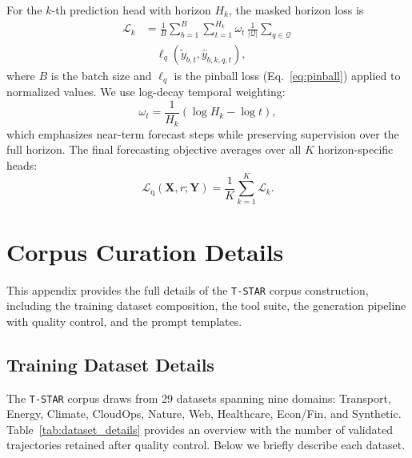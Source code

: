 \documentclass[11pt]{article}
\begin{document}
For the $k$-th prediction head with horizon $H_k$, the masked horizon loss is
\begin{equation}
    \begin{aligned}
    \mathcal{L}_{k}
    &=
    \frac{1}{B}
    \sum_{b=1}^{B}
    \sum_{t=1}^{H_k}
    \omega_t\,
    \frac{1}{|\mathcal{Q}|}
    \sum_{q\in\mathcal{Q}} \\
    &\quad
    \ell_q(\tilde{y}_{b,t},\hat{y}_{b,k,q,t}),
    \end{aligned}
\end{equation}
where $B$ is the batch size and $\ell_q$ is the pinball loss (Eq.~\eqref{eq:pinball}) applied to normalized values.
We use log-decay temporal weighting:
\begin{equation}
    \omega_t = \frac{1}{H_k}\left(\log H_k - \log t\right),
\end{equation}
which emphasizes near-term forecast steps while preserving supervision over the full horizon.
The final forecasting objective averages over all $K$ horizon-specific heads:
\begin{equation}
    \mathcal{L}_{\mathrm{q}}(\mathbf{X}, r; \mathbf{Y})
    =
    \frac{1}{K}
    \sum_{k=1}^{K}
    \mathcal{L}_{k}.
\end{equation}



\section{Corpus Curation Details}

This appendix provides the full details of the \texttt{T-STAR} corpus construction, including the training dataset composition, the tool suite, the generation pipeline with quality control, and the prompt templates.

\subsection{Training Dataset Details}
\label{app:datasets}

The \texttt{T-STAR} corpus draws from 29 datasets spanning nine domains: Transport, Energy, Climate, CloudOps, Nature, Web, Healthcare, Econ/Fin, and Synthetic.
Table~\ref{tab:dataset_details} provides an overview with the number of validated trajectories retained after quality control.
Below we briefly describe each dataset.
\end{document}
